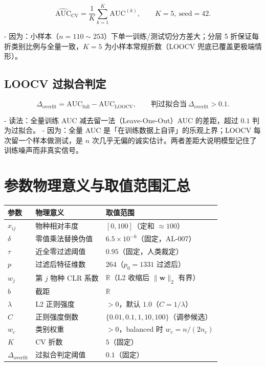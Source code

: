 \documentclass{internal-report}
\begin{document}
\begin{equation}
  \widehat{\mathrm{AUC}}_{\text{CV}} = \frac{1}{K}\sum_{k=1}^{K}\mathrm{AUC}^{(k)},
  \qquad
  K=5,\ \text{seed}=42.
  \label{eq:cv}
\end{equation}

- 因为：小样本（$n=110\sim253$）下单一训练/测试切分方差大；分层 5 折保证每折类别比例与全量一致，$K=5$ 为小样本常规折数（LOOCV 兜底已覆盖更极端情形）。

\subsection{LOOCV 过拟合判定}

\begin{equation}
  \Delta_{\text{overfit}} = \mathrm{AUC}_{\text{full}} - \mathrm{AUC}_{\text{LOOCV}},
  \qquad
  \text{判过拟合当}\ \Delta_{\text{overfit}} > 0.1.
  \label{eq:loocv}
\end{equation}

- 读法：全量训练 AUC 减去留一法（Leave-One-Out）AUC 的差距，超过 $0.1$ 判为过拟合。
- 因为：全量 AUC 是「在训练数据上自评」的乐观上界；LOOCV 每次留一个样本做测试，是 $n$ 次几乎无偏的诚实估计。两者差距大说明模型记住了训练噪声而非真实信号。

\section{参数物理意义与取值范围汇总}

\begin{center}
\footnotesize
\begin{tabular}{p{2.6cm}p{5.4cm}p{5.4cm}}
\toprule
参数 & 物理意义 & 取值范围 \\
\midrule
$x_{ij}$ & 物种相对丰度 & $[0,100]$（定和 $\approx 100$） \\
$\delta$ & 零值乘法替换伪值 & $6.5\times10^{-6}$（固定，AL-007） \\
$\tau$ & 近全零过滤阈值 & $0.95$（固定，人类裁定） \\
$p$ & 过滤后特征维数 & $264$（$p_0=1331$ 过滤后） \\
$w_j$ & 第 $j$ 物种 CLR 系数 & $\mathbb{R}$（L2 收缩后 $\lVert\mathbf{w}\rVert_2$ 有界） \\
$b$ & 截距 & $\mathbb{R}$ \\
$\lambda$ & L2 正则强度 & $>0$，默认 $1.0$（$C=1/\lambda$） \\
$C$ & 正则强度倒数 & $\{0.01,0.1,1,10,100\}$（调参候选） \\
$w_c$ & 类别权重 & $>0$，balanced 时 $w_c=n/(2n_c)$ \\
$K$ & CV 折数 & $5$（固定） \\
$\Delta_{\text{overfit}}$ & 过拟合判定阈值 & $0.1$（固定） \\
\bottomrule
\end{tabular}
\end{center}
\end{document}

